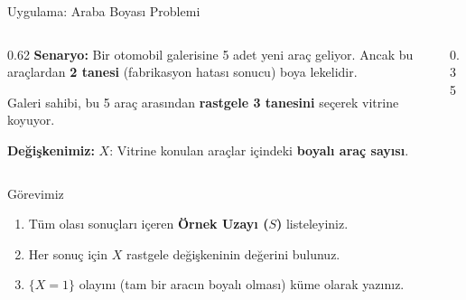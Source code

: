 \documentclass[light]{lutbeamer}
\begin{document}
\begin{frame}{Uygulama: Araba Boyası Problemi}
    \small
    \begin{columns}[T]
        \begin{column}{0.62\textwidth}
            \textbf{Senaryo:}
            Bir otomobil galerisine 5 adet yeni araç geliyor. 
            Ancak bu araçlardan \textbf{2 tanesi} (fabrikasyon hatası sonucu) boya lekelidir.
            
            \vspace{0.2cm}
            Galeri sahibi, bu 5 araç arasından \textbf{rastgele 3 tanesini} seçerek vitrine koyuyor.
            
            \vspace{0.2cm}
            \textbf{Değişkenimiz:}
            $X$: Vitrine konulan araçlar içindeki \textbf{boyalı araç sayısı}.
        \end{column}
        \begin{column}{0.35\textwidth}
            \centering
        \end{column}
    \end{columns}

    \vspace{0.4cm}
    \begin{block}{Görevimiz}
        \begin{enumerate}
            \item[(a)] Tüm olası sonuçları içeren \textbf{Örnek Uzayı ($S$)} listeleyiniz.
            \item[(b)] Her sonuç için $X$ rastgele değişkeninin değerini bulunuz.
            \item[(c)] $\{X = 1\}$ olayını (tam bir aracın boyalı olması) küme olarak yazınız.
        \end{enumerate}
    \end{block}
\end{frame}
\end{document}
